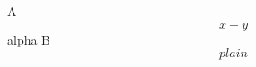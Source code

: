 \documentclass{article}
\begin{document}
A \begin{equation}x+y\end{equation}alpha B
\[
plain
\]
\end{document}
